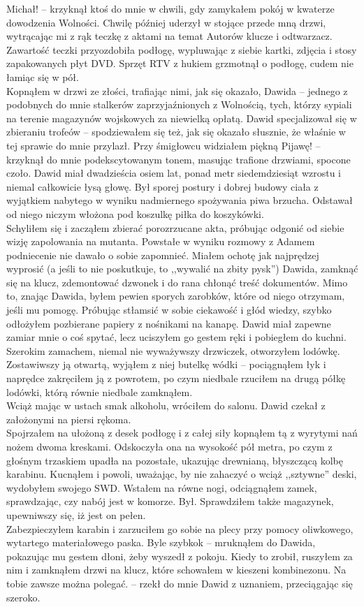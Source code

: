 \documentclass[../MAIN.tex]{subfiles}
\begin{document}
\sx Michał! -- krzyknął ktoś do mnie w chwili, gdy zamykałem pokój w kwaterze dowodzenia Wolności.\qd
Chwilę później uderzył w stojące przede mną drzwi, wytrącając mi z rąk teczkę z aktami na temat Autorów klucze i odtwarzacz. Zawartość teczki przyozdobiła podłogę, wypluwając z siebie kartki, zdjęcia i stosy zapakowanych płyt DVD. Sprzęt RTV z hukiem grzmotnął o podłogę, cudem nie łamiąc się w pół.\\
Kopnąłem w drzwi ze złości, trafiając nimi, jak się okazało, Dawida -- jednego z podobnych do mnie stalkerów zaprzyjaźnionych z Wolnością, tych, którzy sypiali na terenie magazynów wojskowych za niewielką opłatą. Dawid specjalizował się w zbieraniu trofeów -- spodziewałem się też, jak się okazało słusznie, że właśnie w tej sprawie do mnie przylazł.
\sx Przy śmigłowcu widziałem piękną Pijawę! -- krzyknął do mnie podekscytowanym tonem, masując trafione drzwiami, spocone czoło. 
\qd
Dawid miał dwadzieścia osiem lat, ponad metr siedemdziesiąt wzrostu i niemal całkowicie łysą głowę. Był sporej postury i dobrej budowy ciała z wyjątkiem nabytego w wyniku nadmiernego spożywania piwa brzucha. Odstawał od niego niczym włożona pod koszulkę piłka do koszykówki.
\\
Schyliłem się i zacząłem zbierać porozrzucane akta, próbując odgonić od siebie wizję zapolowania na mutanta. Powstałe w wyniku rozmowy z Adamem podniecenie nie dawało o sobie zapomnieć. Miałem ochotę jak najprędzej wyprosić (a jeśli to nie poskutkuje, to ,,wywalić na zbity pysk'') Dawida, zamknąć się na klucz, zdemontować dzwonek i do rana chłonąć treść dokumentów. Mimo to, znając Dawida, byłem pewien sporych zarobków, które od niego otrzymam, jeśli mu pomogę. Próbując stłamsić w sobie ciekawość i głód wiedzy, szybko odłożyłem pozbierane papiery z nośnikami na kanapę. Dawid miał zapewne zamiar mnie o coś spytać, lecz uciszyłem go gestem ręki i pobiegłem do kuchni.
\\
Szerokim zamachem, niemal nie wyważywszy drzwiczek, otworzyłem lodówkę. Zostawiwszy ją otwartą, wyjąłem z niej butelkę wódki -- pociągnąłem łyk i naprędce zakręciłem ją z powrotem, po czym niedbale rzuciłem na drugą półkę lodówki, którą równie niedbale zamknąłem.
\\
Wciąż mając w ustach smak alkoholu, wróciłem do salonu. Dawid czekał z założonymi na piersi rękoma.
\\
Spojrzałem na ułożoną z desek podłogę i z całej siły kopnąłem tą z wyrytymi nań nożem dwoma kreskami. Odskoczyła ona na wysokość pół metra, po czym z głośnym trzaskiem upadła na pozostałe, ukazując drewnianą, błyszczącą kolbę karabinu. Kucnąłem i powoli, uważając, by nie zahaczyć o wciąż ,,sztywne'' deski, wydobyłem swojego SWD. Wstałem na równe nogi, odciągnąłem zamek, sprawdzając, czy nabój jest w komorze. Był. Sprawdziłem także magazynek, upewniwszy się, iż jest on pełen.
\\
Zabezpieczyłem karabin i zarzuciłem go sobie na plecy przy pomocy oliwkowego, wytartego materiałowego paska.
\sx Byle szybko\3k -- mruknąłem do Dawida, pokazując mu gestem dłoni, żeby wyszedł z pokoju. 
\qd
Kiedy to zrobił, ruszyłem za nim i zamknąłem drzwi na klucz, które schowałem w kieszeni kombinezonu.
\sx Na tobie zawsze można polegać. -- rzekł do mnie Dawid z uznaniem, przeciągając się szeroko.
\qd 
\end{document}
